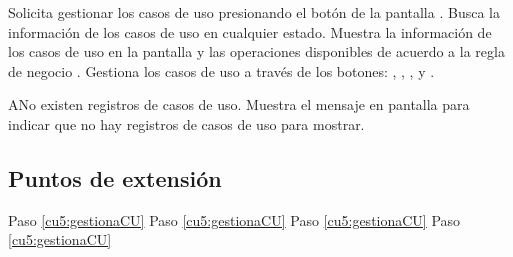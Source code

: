  \begin{UCtrayectoria}
    \UCpaso[\UCactor] Solicita gestionar los casos de uso presionando el botón \btnCU de la pantalla .
    \UCpaso[\UCsist] Busca la información de los casos de uso en cualquier estado. 
    \UCpaso[\UCsist] Muestra la información de los casos de uso en la pantalla  y las operaciones 
    disponibles de acuerdo a la regla de negocio . 
    \UCpaso[\UCactor] Gestiona los casos de uso a través de los botones: \btnRevisar, , \btnConsulta, \btnEditar y \btnEliminar. \label{cu5:gestionaCU}
 \end{UCtrayectoria}
 
 \begin{UCtrayectoriaA}{A}{No existen registros de casos de uso.}
    \UCpaso[\UCsist] Muestra el mensaje  en pantalla  
    para indicar que no hay registros de casos de uso para mostrar.
 \end{UCtrayectoriaA}
 

\subsection{Puntos de extensión}

	{Paso \ref{cu5:gestionaCU}}
	{}
	{Paso \ref{cu5:gestionaCU}}
	{}	
	{Paso \ref{cu5:gestionaCU}}
	{}
	{Paso \ref{cu5:gestionaCU}}
	{}
  